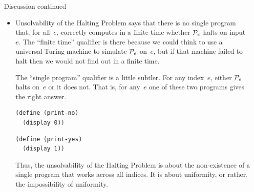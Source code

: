 \documentclass[9pt,t,serif,professionalfont,xcolor={table,dvipsnames},noamsthm]{beamer}
\begin{document}
\begin{frame}[fragile]{Discussion continued}
\begin{itemize}
\item Unsolvability of the Halting Problem 
  says that there is no single program that, for all~$e$, correctly computes 
  in a finite time whether $\mathcal{P}_e$ halts on input~$e$.
  The ``finite time'' qualifier is there because we could think 
  to use a universal
  Turing machine to simulate $\mathcal{P}_e$ on~$e$, but if that machine failed to halt
  then we would not find out in a finite time.
 
  The ``single program'' qualifier is a little subtler.
  For any index~$e$,
  either $\mathcal{P}_e$ halts on~$e$ or it does not.
  That is, for any~$e$ one of these two programs
  gives the right answer.
\begin{center}
\vspace*{-\ht\strutbox}
\begin{minipage}[t]{0.4\linewidth}%
\begin{lstlisting}
(define (print-no)
  (display 0))
\end{lstlisting}%
\end{minipage}%
\hspace*{2em plus 0.5fil}
\begin{minipage}[t]{0.4\linewidth}%
\begin{lstlisting}
(define (print-yes)
  (display 1))
\end{lstlisting}%
\end{minipage}%
\end{center}

Thus, the unsolvability of the Halting Problem is about 
the non-existence of a single program that works across all
indices.
It is about uniformity,
or rather, the impossibility of uniformity.
\end{itemize}
\end{frame}




\end{document}
